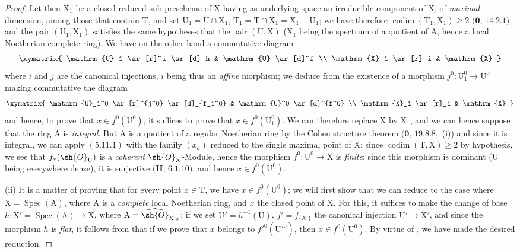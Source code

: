 \begin{proof}
Let then $\mathrm{X}_1$ be a closed reduced sub-prescheme of $\mathrm{X}$ having as underlying space an irreducible component of $\mathrm{X}$, of \emph{maximal} dimension, among those that contain $\mathrm{T}$, and set $\mathrm{U}_1=\mathrm{U}\cap\mathrm{X}_1$, $\mathrm{T}_1=\mathrm{T}\cap\mathrm{X}_1=\mathrm{X}_1-\mathrm{U}_1$; we have therefore $\operatorname{codim}(\mathrm{T}_1,\mathrm{X}_1)\geq 2$ $(\mathbf{0}$, $14.2.1)$, and the pair $(\mathrm{U}_1,\mathrm{X}_1)$ satisfies the same hypotheses that the pair $(\mathrm{U},\mathrm{X})$ ($\mathrm{X}_1$ being the spectrum of a quotient of $\mathrm{A}$, hence a local Noetherian complete ring).
We have on the other hand a commutative diagram
\[
  \xymatrix{
    \mathrm{U}_1 \ar[r]^i \ar[d]_h & \mathrm{U} \ar[d]^f \\
    \mathrm{X}_1 \ar[r]_i & \mathrm{X}
  }
\]
where $i$ and $j$ are the canonical injections, $i$ being thus an \emph{affine} morphism; we deduce from  the existence of a morphism $j^0:\mathrm{U}_1^0\to\mathrm{U}^0$ making commutative the diagram
\[
  \xymatrix{
    \mathrm{U}_1^0 \ar[r]^{j^0} \ar[d]_{f_1^0} & \mathrm{U}^0 \ar[d]^{f^0} \\
    \mathrm{X}_1 \ar[r]_i & \mathrm{X}
  }
\]
and hence, to prove that $x\in f^0(\mathrm{U}^0)$, it suffices to prove that $x\in f_1^0(\mathrm{U}_1^0)$.
We can therefore replace $\mathrm{X}$ by $\mathrm{X}_1$, and we can hence suppose that the ring $\mathrm{A}$ is \emph{integral}.
But $\mathrm{A}$ is a quotient of a regular Noetherian ring by the Cohen structure theorem $(\mathbf{0}$, $19.8.8$,~(i)) and since it is integral, we can apply $(5.11.1)$ with the family $(x_a)$ reduced to the single maximal point of $\mathrm{X}$; since $\operatorname{codim}(\mathrm{T},\mathrm{X})\geq 2$ by hypothesis, we see that $f_*(\sh{O}_{\mathrm{U}})$ is a \emph{coherent} $\sh{O}_{\mathrm{X}}$-Module, hence the morphism $f^0:\mathrm{U}^0\to\mathrm{X}$ is \emph{finite}; since this morphism is dominant ($\mathrm{U}$ being everywhere dense), it is surjective $(\mathbf{II}$, $6.1.10)$, and hence $x\in f^0(\mathrm{U}^0)$.

(ii) It is a matter of proving that for every point $x\in\mathrm{T}$, we have $x\in f^0(\mathrm{U}^0)$; we will first show that we can reduce to the case where $\mathrm{X}=\operatorname{Spec}(\mathrm{A})$, where $\mathrm{A}$ is a \emph{complete} local Noetherian ring, and $x$ the closed point of $\mathrm{X}$.
For this, it suffices to make the change of base $h:\mathrm{X}'=\operatorname{Spec}(\mathrm{A})\to\mathrm{X}$, where $\mathrm{A}=\widehat{\sh{O}}_{\mathrm{X},x}$; if we set $\mathrm{U}'=h^{-1}(\mathrm{U})$, $f'=f_{\{X'\}}$ the canonical injection $\mathrm{U}'\to\mathrm{X}'$, and since the morphism $h$ is \emph{flat}, it follows from  that if we prove that $x$ belongs to $f'^0(\mathrm{U}'^0)$, then $x\in f^0(\mathrm{U}^0)$.
By virtue of , we have made the desired reduction.


\end{proof}
